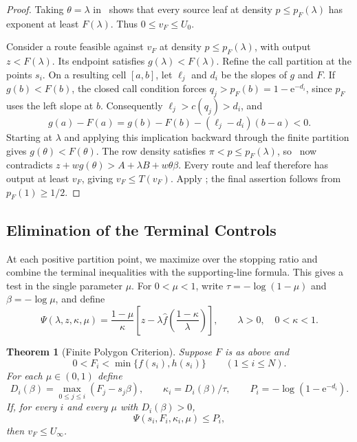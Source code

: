 \documentclass[11pt]{article}
\newtheorem{theorem}{Theorem}
\theoremstyle{definition}
\newcommand{\e}{\mathrm e}
\begin{document}
\begin{proof}
Taking $\theta=\lambda$ in~ shows that every source leaf at density $p\le p_F(\lambda)$ has exponent at least $F(\lambda)$.
Thus $0\le v_F\le U_0$.

Consider a route feasible against $v_F$ at density $p\le p_F(\lambda)$, with output $z<F(\lambda)$.
Its endpoint satisfies $g(\lambda)<F(\lambda)$.
Refine the call partition at the points $s_i$.
On a resulting cell $[a,b]$, let $\ell_j$ and $d_i$ be the slopes of $g$ and $F$.
If $g(b)<F(b)$, the closed call condition forces $q_j>p_F(b)=1-\e^{-d_i}$, since $p_F$ uses the left slope at $b$.
Consequently $\ell_j>c(q_j)>d_i$, and
\[
 g(a)-F(a)=g(b)-F(b)-(\ell_j-d_i)(b-a)<0.
\]
Starting at $\lambda$ and applying this implication backward through the finite partition gives $g(\theta)<F(\theta)$.
The row density satisfies $\pi<p\le p_F(\lambda)$, so~ now contradicts
$z+wg(\theta)>A+\lambda B+w\theta\beta$.
Every route and leaf therefore has output at least $v_F$, giving $v_F\le T(v_F)$.
Apply ; the final assertion follows from $p_F(1)\ge1/2$.
\end{proof}

\subsection{Elimination of the Terminal Controls}
At each positive partition point, we maximize over the stopping ratio and combine the terminal inequalities with the supporting-line formula.
This gives a test in the single parameter $\mu$.
For $0<\mu<1$, write $\tau=-\log(1-\mu)$ and $\beta=-\log\mu$, and define
\begin{equation}\label{eq:Psi}
 \Psi(\lambda,z,\kappa,\mu)
 =\frac{1-\mu}{\kappa}
 \left[z-\lambda\widehat f\!\left(\frac{1-\kappa}{\lambda}\right)\right],
 \qquad \lambda>0,\quad 0<\kappa<1.
\end{equation}

\begin{theorem}[Finite Polygon Criterion]\label{thm:polygon}
Suppose $F$ is as above and
\begin{equation}\label{eq:node-bounds}
 0<F_i<\min\{f(s_i),h(s_i)\}\qquad(1\le i\le N).
\end{equation}
For each $\mu\in(0,1)$ define
\begin{equation}\label{eq:D}
 D_i(\beta)=\max_{0\le j\le i}(F_j-s_j\beta),\qquad
 \kappa_i=D_i(\beta)/\tau,\qquad
 P_i=-\log(1-\e^{-d_i}).
\end{equation}
If, for every $i$ and every $\mu$ with $D_i(\beta)>0$,
\begin{equation}\label{eq:node-test}
 \Psi(s_i,F_i,\kappa_i,\mu)\le P_i,
\end{equation}
then $v_F\le U_\infty$.
\end{theorem}
\end{document}
